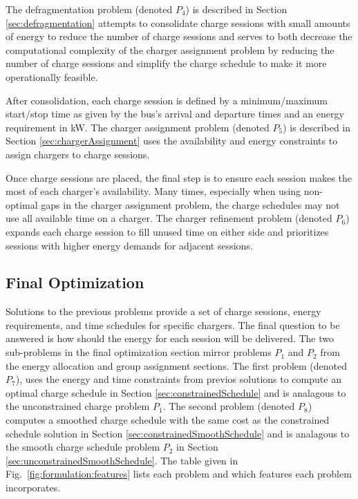 \par The defragmentation problem (denoted $P_4$) is described in Section \ref{sec:defragmentation} attempts to consolidate charge sessions with small amounts of energy to reduce the number of charge sessions and serves to both decrease the computational complexity of the charger assignment problem by reducing the number of charge sessions and simplify the charge schedule to make it more operationally feasible.  
\par After consolidation, each charge session is defined by a minimum/maximum start/stop time as given by the bus's arrival and departure times and an energy requirement in kW. The charger assignment problem (denoted $P_5$) is described in Section \ref{sec:chargerAssignment} uses the availability and energy constraints to assign chargers to charge sessions.  
\par Once charge sessions are placed, the final step is to ensure each session makes the most of each charger's availability. Many times, especially when using non-optimal gaps in the charger assignment problem, the charge schedules may not use all available time on a charger. The charger refinement problem (denoted $P_6$) expands each charge session to fill unused time on either side and prioritizes sessions with higher energy demands for adjacent sessions.  

\subsection{Final Optimization} 
Solutions to the previous problems provide a set of charge sessions, energy requirements, and time schedules for specific chargers. The final question to be answered is how should the energy for each session will be delivered. The two sub-problems in the final optimization section mirror problems $P_1$ and $P_2$ from the energy allocation and group assignment sections. The first problem (denoted $P_7$), uses the energy and time constraints from previos solutions to compute an optimal charge schedule in Section \ref{sec:constrainedSchedule} and is analagous to the unconstrained charge problem $P_1$. The second problem (denoted $P_8$) computes a smoothed charge schedule with the same cost as the constrained schedule solution in Section \ref{sec:constrainedSmoothSchedule} and is analagous to the smooth charge schedule problem $P_2$ in Section \ref{sec:unconstrainedSmoothSchedule}. The table given in Fig.~\ref{fig:formulation:features} lists each problem and which features each problem incorporates.

 
 
 


